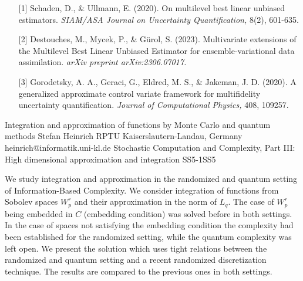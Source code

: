 \begin{talk}
\medskip

\begin{enumerate}
    \item[{[1]}] Schaden, D., \& Ullmann, E. (2020). On multilevel best linear unbiased estimators. \textit{SIAM/ASA Journal on Uncertainty Quantification,} 8(2), 601-635.
    \item[{[2]}] Destouches, M., Mycek, P., \& Gürol, S. (2023). Multivariate extensions of the Multilevel Best Linear Unbiased Estimator for ensemble-variational data assimilation. \textit{arXiv preprint arXiv:2306.07017.}
    \item[{[3]}] Gorodetsky, A. A., Geraci, G., Eldred, M. S., \& Jakeman, J. D. (2020). A generalized approximate control variate framework for multifidelity uncertainty quantification. \textit{Journal of Computational Physics,} 408, 109257.
\end{enumerate}


\end{talk}

\begin{talk}
  {Integration and approximation of functions by Monte Carlo and quantum\\ methods}%
  {Stefan Heinrich}%
  {RPTU Kaiserslautern-Landau, Germany}
{heinrich@informatik.uni-kl.de}
{}
{Stochastic Computation and Complexity, Part III: High dimensional approximation and integration}
{}{SS5-1}{SS5}

			

We study integration and approximation in the randomized and quantum setting of Informa\-tion-Based Complexity. 
We consider integration  of functions from Sobolev spaces $W_p^r$ and their approximation in the norm of $L_q$. The case of $W_p^r$ being embedded in $C$ (embedding condition) was solved before in both settings. 
In the case of spaces not satisfying the embedding condition the complexity had been established for the randomized setting, while the quantum complexity was left open. We present the solution which uses tight relations between the randomized and quantum setting and a recent randomized discretization technique. The results are compared to the previous ones in both settings.


\end{talk}

